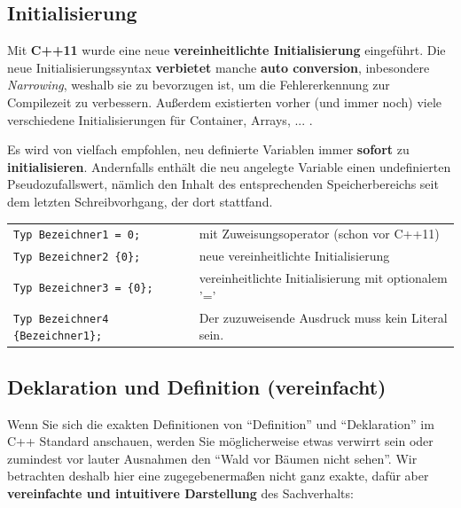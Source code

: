 \documentclass[a4paper]{report}
\begin{document}

\subsection{Initialisierung}
Mit \textbf{C++11} wurde eine neue \textbf{vereinheitlichte Initialisierung} eingeführt. Die neue Initialisierungssyntax \textbf{verbietet} manche \textbf{auto conversion}, inbesondere \textit{Narrowing}, weshalb sie zu bevorzugen ist, um die Fehlererkennung zur Compilezeit zu verbessern. Außerdem existierten vorher (und immer noch) viele verschiedene Initialisierungen für Container, Arrays, ... .

Es wird von vielfach empfohlen, neu definierte Variablen immer \textbf{sofort} zu \textbf{initialisieren}. Andernfalls enthält die neu angelegte Variable einen undefinierten Pseudozufallswert, nämlich den Inhalt des entsprechenden Speicherbereichs seit dem letzten Schreibvorhgang, der dort stattfand.
\begin{center}
\begin{tabular}{|l|l|}
	\hline
	\texttt{Typ Bezeichner1 = 0;} & mit Zuweisungsoperator (schon vor C++11) \\
	\texttt{Typ Bezeichner2 \textrm{\{}0\textrm{\}};} & neue vereinheitlichte Initialisierung \\
	\texttt{Typ Bezeichner3 = \textrm{\{}0\textrm{\}};} & vereinheitlichte Initialisierung mit optionalem '=' \\
	\texttt{Typ Bezeichner4 \textrm{\{}Bezeichner1\textrm{\}};} & Der zuzuweisende Ausdruck muss kein Literal sein. \\
	\hline
\end{tabular}
\end{center}

\subsection{Deklaration und Definition (vereinfacht)}

Wenn Sie sich die exakten Definitionen von "`Definition"' und "`Deklaration"' im C++ Standard anschauen, werden Sie möglicherweise etwas verwirrt sein oder zumindest vor lauter Ausnahmen den "`Wald vor Bäumen nicht sehen"'. Wir betrachten deshalb hier eine zugegebenermaßen nicht ganz exakte, dafür aber \textbf{vereinfachte und intuitivere Darstellung} des Sachverhalts:
\end{document}
